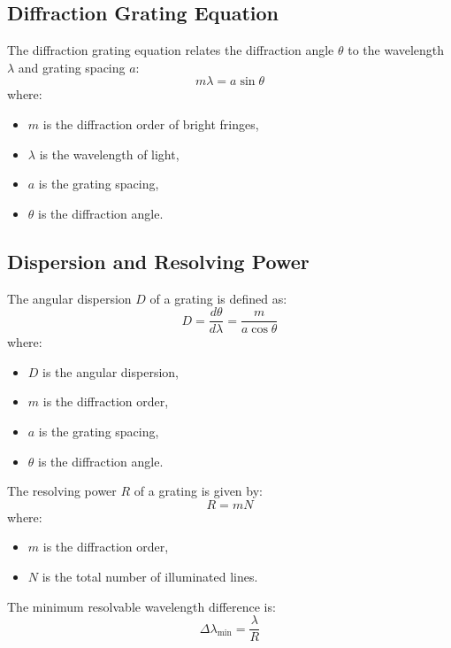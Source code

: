 \documentclass[journal]{IEEEtran}
\begin{document}
\subsection{Diffraction Grating Equation}
The diffraction grating equation relates the diffraction angle $\theta$ to the wavelength $\lambda$ and grating spacing $a$:
\begin{equation}
    m\lambda = a \sin\theta
    \label{eq:diffraction_grating}
\end{equation}
where:
\begin{itemize}
    \item $m$ is the diffraction order of bright fringes,
    \item $\lambda$ is the wavelength of light,
    \item $a$ is the grating spacing,
    \item $\theta$ is the diffraction angle.
\end{itemize}

\subsection{Dispersion and Resolving Power}
The angular dispersion $D$ of a grating is defined as:
\begin{equation}
    D = \frac{d\theta}{d\lambda} = \frac{m}{a \cos\theta}
    \label{eq:angular_dispersion}
\end{equation}
where:
\begin{itemize}
    \item $D$ is the angular dispersion,
    \item $m$ is the diffraction order,
    \item $a$ is the grating spacing,
    \item $\theta$ is the diffraction angle.
\end{itemize}

The resolving power $R$ of a grating is given by:
\begin{equation}
    R = mN
    \label{eq:resolving_power}
\end{equation}
where:
\begin{itemize}
    \item $m$ is the diffraction order,
    \item $N$ is the total number of illuminated lines.
\end{itemize} 

The minimum resolvable wavelength difference is:
\begin{equation}
    \Delta\lambda_{\text{min}} = \frac{\lambda}{R}
    \label{eq:delta_lambda_min}
\end{equation}
 
\end{document}
